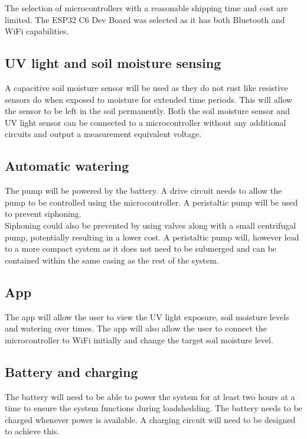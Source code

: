 The selection of microcontrollers with a reasonable shipping time and cost are limited. The ESP32 C6 Dev Board was selected as it has both Bluetooth and WiFi capabilities.


\subsection{UV light and soil moisture sensing}
A capacitive soil moisture sensor will be used as they do not rust like resistive sensors do when exposed to moisture for extended time periods. This will allow the sensor to be left in the soil permanently. Both the soil moisture sensor and UV light sensor can be connected to a microcontroller without any additional circuits and output a measurement equivalent voltage. 

\subsection{Automatic watering}
The pump will be powered by the battery. A drive circuit needs to allow the pump to be controlled using the microcontroller. A peristaltic pump will be used to prevent siphoning. \\

Siphoning could also be prevented by using valves along with a small centrifugal pump, potentially resulting in a lower cost. A peristaltic pump will, however lead to a more compact system as it does not need to be submerged and can be contained within the same casing as the rest of the system.

\subsection{App}
The app will allow the user to view the UV light exposure, soil moisture levels and watering over times. The app will also allow the user to connect the microcontroller to WiFi initially and change the target soil moisture level. 

\subsection{Battery and charging}
The battery will need to be able to power the system for at least two hours at a time to ensure the system functions during loadshedding. The battery needs to be charged whenever power is available. A charging circuit will need to be designed to achieve this.
\\

